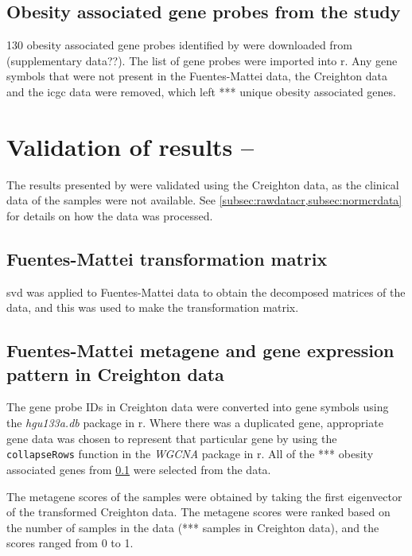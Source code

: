 \subsection{Obesity associated gene probes from the \citet{Fuentes-Mattei2014} study}
\label{subsec:fmobsgene}

130 obesity associated gene probes identified by \citet{Fuentes-Mattei2014} were downloaded from (supplementary data??).
The list of gene probes were imported into \gls{r}.
Any gene symbols that were not present in the Fuentes-Mattei data, the Creighton data and the \gls{icgc} data were removed, which left *** unique obesity associated genes.

\section{Validation of results -- \citet{Fuentes-Mattei2014}}
\label{sec:valresultsfm}

The results presented by \citet{Fuentes-Mattei2014} were validated using the Creighton data, as the clinical data of the samples were not available.
See \cref{subsec:rawdatacr,subsec:normcrdata} for details on how the data was processed.

\subsection{Fuentes-Mattei transformation matrix}
\label{subsec:transmatfm}

\gls{svd} was applied to Fuentes-Mattei data to obtain the decomposed matrices of the data, and this was used to make the transformation matrix.

\subsection{Fuentes-Mattei metagene and gene expression pattern in Creighton data}
\label{subsec:fmmetage}

The gene probe IDs in Creighton data were converted into gene symbols using the \textit{hgu133a.db} package in \gls{r}.
Where there was a duplicated gene, appropriate gene data was chosen to represent that particular gene by using the \texttt{collapseRows} function in the \textit{WGCNA} package in \gls{r}.
All of the *** obesity associated genes from  \cref{subsec:fmobsgene} were selected from the data.

The \gls{metagene} scores of the samples were obtained by taking the first eigenvector of the transformed Creighton data.
The \gls{metagene} scores were ranked based on the number of samples in the data (*** samples in Creighton data), and the scores ranged from 0 to 1.

